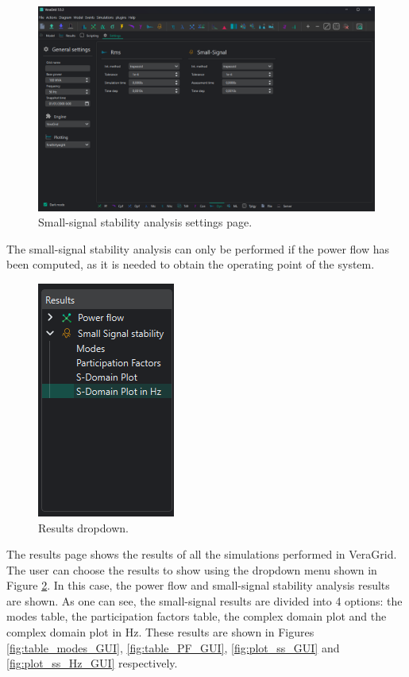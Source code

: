 \begin{figure}[H]
  \centering
  \includegraphics[width=0.8\linewidth]{figures/settings_GUI.png}
  \caption{Small-signal stability analysis settings page.}
  \label{fig:smallsignal_settings_GUI}
\end{figure}

The small-signal stability analysis can only be performed if the power flow has been computed,
 as it is needed to obtain the operating point of the system.


\begin{figure}[H]
  \centering
  \includegraphics[width=0.25\linewidth]{figures/results_desplegable_GUI.png}
  \caption{Results dropdown.}
  \label{fig:results_dropdown_GUI}
\end{figure}

The results page shows the results of all the simulations performed in VeraGrid. The user can choose the results to show
using the dropdown menu shown in Figure \ref{fig:results_dropdown_GUI}. In this case, the power flow and small-signal stability
analysis results are shown. As one can see, the small-signal results are divided into 4 options: the modes table, the participation
factors table, the complex domain plot and the complex domain plot in Hz. These results are shown in Figures \ref{fig:table_modes_GUI},
\ref{fig:table_PF_GUI}, \ref{fig:plot_ss_GUI} and \ref{fig:plot_ss_Hz_GUI} respectively.

